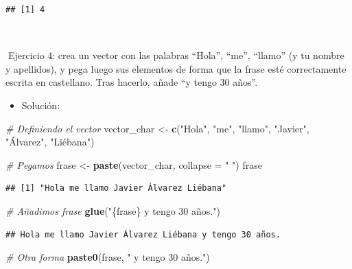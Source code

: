 \documentclass[11pt,]{book}
\newenvironment{Shaded}{\begin{snugshade}}{\end{snugshade}}
\newcommand{\CommentTok}[1]{\textcolor[rgb]{0.37,0.37,0.37}{\textit{#1}}}
\newcommand{\DataTypeTok}[1]{\textcolor[rgb]{0.27,0.27,0.27}{#1}}
\newcommand{\KeywordTok}[1]{\textcolor[rgb]{0.27,0.27,0.27}{\textbf{#1}}}
\newcommand{\NormalTok}[1]{#1}
\newcommand{\StringTok}[1]{\textcolor[rgb]{0.5,0.5,0.5}{#1}}
\providecommand{\tightlist}{%
  \setlength{\itemsep}{0pt}\setlength{\parskip}{0pt}}
\begin{document}
\begin{verbatim}
## [1] 4
\end{verbatim}

~

📝Ejercicio 4: crea un vector con las palabras ``Hola'', ``me'', ``llamo'' (y tu nombre y apellidos), y pega luego sus elementos de forma que la frase esté correctamente escrita en castellano. Tras hacerlo, añade ``y tengo 30 años''.

\begin{itemize}
\tightlist
\item
  Solución:
\end{itemize}

\begin{Shaded}
\begin{Highlighting}[]
\CommentTok{# Definiendo el vector}
\NormalTok{vector_char <-}\StringTok{ }\KeywordTok{c}\NormalTok{(}\StringTok{"Hola"}\NormalTok{, }\StringTok{"me"}\NormalTok{, }\StringTok{"llamo"}\NormalTok{, }\StringTok{"Javier"}\NormalTok{,}
                 \StringTok{"Álvarez"}\NormalTok{, }\StringTok{"Liébana"}\NormalTok{)}

\CommentTok{# Pegamos}
\NormalTok{frase <-}\StringTok{ }\KeywordTok{paste}\NormalTok{(vector_char, }\DataTypeTok{collapse =} \StringTok{" "}\NormalTok{)}
\NormalTok{frase}
\end{Highlighting}
\end{Shaded}

\begin{verbatim}
## [1] "Hola me llamo Javier Álvarez Liébana"
\end{verbatim}

\begin{Shaded}
\begin{Highlighting}[]
\CommentTok{# Añadimos frase}
\KeywordTok{glue}\NormalTok{(}\StringTok{"\{frase\} y tengo 30 años."}\NormalTok{)}
\end{Highlighting}
\end{Shaded}

\begin{verbatim}
## Hola me llamo Javier Álvarez Liébana y tengo 30 años.
\end{verbatim}

\begin{Shaded}
\begin{Highlighting}[]
\CommentTok{# Otra forma}
\KeywordTok{paste0}\NormalTok{(frase, }\StringTok{" y tengo 30 años."}\NormalTok{)}
\end{Highlighting}
\end{Shaded}
\end{document}
